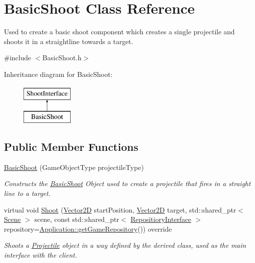 \hypertarget{class_basic_shoot}{}\section{Basic\+Shoot Class Reference}
\label{class_basic_shoot}


Used to create a basic shoot component which creates a single projectile and shoots it in a straightline towards a target.  




{\ttfamily \#include $<$Basic\+Shoot.\+h$>$}

Inheritance diagram for Basic\+Shoot\+:\begin{figure}[H]
\begin{center}
\leavevmode
\includegraphics[height=2.000000cm]{d0/d31/class_basic_shoot}
\end{center}
\end{figure}
\subsection*{Public Member Functions}
\begin{DoxyCompactItemize}
\item 
\hyperlink{class_basic_shoot_a7594a4b840d698baa8d4a51027078727}{Basic\+Shoot} (Game\+Object\+Type projectile\+Type)
\begin{DoxyCompactList}\small\item\em Constructs the \hyperlink{class_basic_shoot}{Basic\+Shoot} Object used to create a projectile that fires in a straight line to a target. \end{DoxyCompactList}\item 
virtual void \hyperlink{class_basic_shoot_a8710518507ed4fc20bef204159e05090}{Shoot} (\hyperlink{class_vector2_d}{Vector2D} start\+Position, \hyperlink{class_vector2_d}{Vector2D} target, std\+::shared\+\_\+ptr$<$ \hyperlink{class_scene}{Scene} $>$ scene, const std\+::shared\+\_\+ptr$<$ \hyperlink{class_repositiory_interface}{Repositiory\+Interface} $>$ repository=\hyperlink{class_application_aa895ae75cdb47ab91584c32b0db0ca06}{Application\+::get\+Game\+Repository}()) override
\begin{DoxyCompactList}\small\item\em Shoots a \hyperlink{class_projectile}{Projectile} object in a way defined by the derived class, used as the main interface with the client. \end{DoxyCompactList}\end{DoxyCompactItemize}
